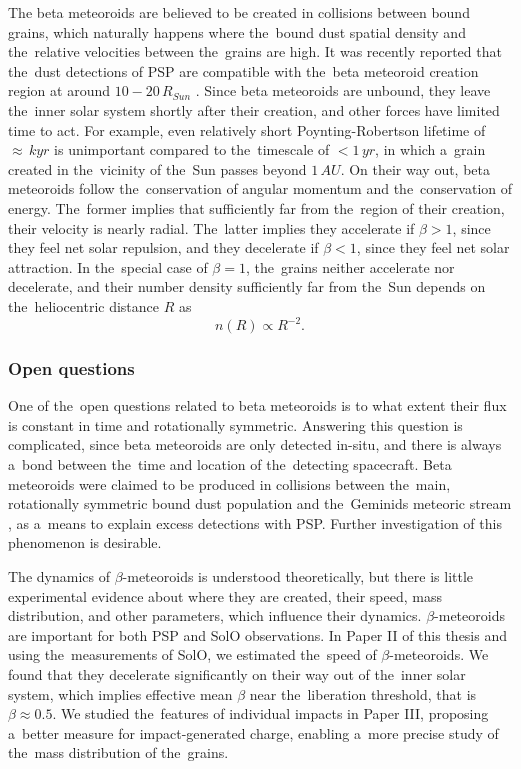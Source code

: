The beta meteoroids are believed to be created in collisions between bound grains, which naturally happens where the~bound dust spatial density and the~relative velocities between the~grains are high. It was recently reported that the~dust detections of PSP are compatible with the~beta meteoroid creation region at around $10 - 20 \, R_{Sun}$ \citep{szalay2021collisional}. Since beta meteoroids are unbound, they leave the~inner solar system shortly after their creation, and other forces have limited time to act. For example, even relatively short Poynting-Robertson lifetime of $\approx \, kyr$ is unimportant compared to the~timescale of $< 1 \, \si{yr}$, in which a~grain created in the~vicinity of the~Sun passes beyond $1 \, \si{AU}$. On their way out, beta meteoroids follow the~conservation of angular momentum and the~conservation of energy. The~former implies that sufficiently far from the~region of their creation, their velocity is nearly radial. The~latter implies they accelerate if $\beta > 1$, since they feel net solar repulsion, and they decelerate if $\beta < 1$, since they feel net solar attraction. In the~special case of $\beta=1$, the~grains neither accelerate nor decelerate, and their number density sufficiently far from the~Sun depends on the~heliocentric distance $R$ as
\begin{equation}
    n(R) \propto R^{-2}. \label{eq:beta_number_density}
\end{equation} 

\subsubsection{Open questions}

One of the~open questions related to beta meteoroids is to what extent their flux is constant in time and rotationally symmetric. Answering this question is complicated, since beta meteoroids are only detected in-situ, and there is always a~bond between the~time and location of the~detecting spacecraft. Beta meteoroids were claimed to be produced in collisions between the~main, rotationally symmetric bound dust population and the~{Geminids} meteoric stream \citep{szalay2021collisional}, as a~means to explain excess detections with PSP. Further investigation of this phenomenon is desirable.

The dynamics of $\beta$-meteoroids is understood theoretically, but there is little experimental evidence about where they are created, their speed, mass distribution, and other parameters, which influence their dynamics. $\beta$-meteoroids are important for both PSP and SolO observations. In Paper II of this thesis and using the~measurements of SolO, we estimated the~speed of $\beta$-meteoroids. We found that they decelerate significantly on their way out of the~inner solar system, which implies effective mean $\beta$ near the~liberation threshold, that is $\beta \approx 0.5$. We studied the~features of individual impacts in Paper III, proposing a~better measure for impact-generated charge, enabling a~more precise study of the~mass distribution of the~grains. 

